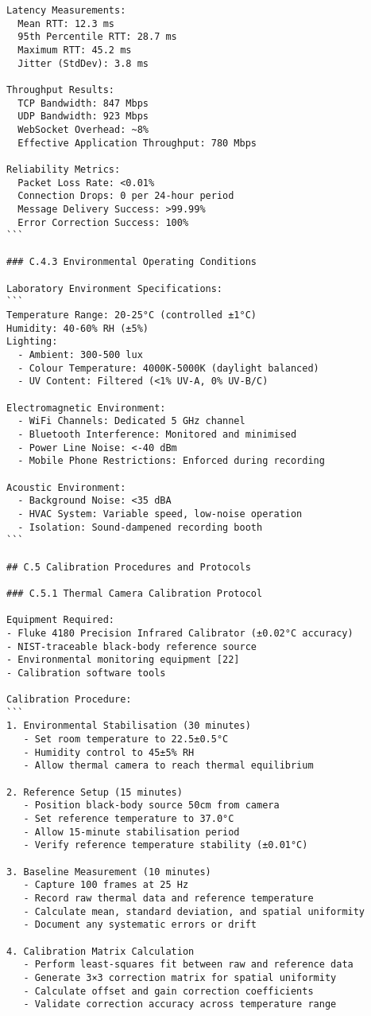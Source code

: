 \begin{verbatim}
Latency Measurements:
  Mean RTT: 12.3 ms
  95th Percentile RTT: 28.7 ms
  Maximum RTT: 45.2 ms
  Jitter (StdDev): 3.8 ms

Throughput Results:
  TCP Bandwidth: 847 Mbps
  UDP Bandwidth: 923 Mbps
  WebSocket Overhead: ~8%
  Effective Application Throughput: 780 Mbps

Reliability Metrics:
  Packet Loss Rate: <0.01%
  Connection Drops: 0 per 24-hour period
  Message Delivery Success: >99.99%
  Error Correction Success: 100%
```

### C.4.3 Environmental Operating Conditions

Laboratory Environment Specifications:
```
Temperature Range: 20-25°C (controlled ±1°C)
Humidity: 40-60% RH (±5%)
Lighting:
  - Ambient: 300-500 lux
  - Colour Temperature: 4000K-5000K (daylight balanced)
  - UV Content: Filtered (<1% UV-A, 0% UV-B/C)

Electromagnetic Environment:
  - WiFi Channels: Dedicated 5 GHz channel
  - Bluetooth Interference: Monitored and minimised
  - Power Line Noise: <-40 dBm
  - Mobile Phone Restrictions: Enforced during recording

Acoustic Environment:
  - Background Noise: <35 dBA
  - HVAC System: Variable speed, low-noise operation
  - Isolation: Sound-dampened recording booth
```

## C.5 Calibration Procedures and Protocols

### C.5.1 Thermal Camera Calibration Protocol

Equipment Required:
- Fluke 4180 Precision Infrared Calibrator (±0.02°C accuracy)
- NIST-traceable black-body reference source
- Environmental monitoring equipment [22]
- Calibration software tools

Calibration Procedure:
```
1. Environmental Stabilisation (30 minutes)
   - Set room temperature to 22.5±0.5°C
   - Humidity control to 45±5% RH
   - Allow thermal camera to reach thermal equilibrium

2. Reference Setup (15 minutes)
   - Position black-body source 50cm from camera
   - Set reference temperature to 37.0°C
   - Allow 15-minute stabilisation period
   - Verify reference temperature stability (±0.01°C)

3. Baseline Measurement (10 minutes)
   - Capture 100 frames at 25 Hz
   - Record raw thermal data and reference temperature
   - Calculate mean, standard deviation, and spatial uniformity
   - Document any systematic errors or drift

4. Calibration Matrix Calculation
   - Perform least-squares fit between raw and reference data
   - Generate 3×3 correction matrix for spatial uniformity
   - Calculate offset and gain correction coefficients
   - Validate correction accuracy across temperature range


\end{verbatim}
